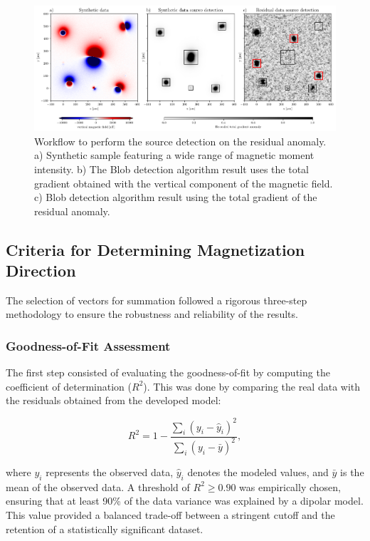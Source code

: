     \begin{figure}[tb!]
      \centering
      \includegraphics[width=1\linewidth]{paper/figures/re-detection-methodology.png}
      \caption{Workflow to perform the source detection on the residual anomaly. a) Synthetic sample featuring a wide range of magnetic moment intensity. b) The Blob detection algorithm result uses the total gradient obtained with the vertical component of the magnetic field. c) Blob detection algorithm result using the total gradient of the residual anomaly.}
      \label{method-redetection}
    \end{figure}


\subsection{Criteria for Determining Magnetization Direction}

The selection of vectors for summation followed a rigorous three-step methodology to ensure the robustness and reliability of the results.

\subsubsection{Goodness-of-Fit Assessment}

The first step consisted of evaluating the goodness-of-fit by computing the coefficient of determination ($R^2$). This was done by comparing the real data with the residuals obtained from the developed model:

\begin{equation}
    R^2 = 1 - \frac{\sum_{i} (y_i - \hat{y}_i)^2}{\sum_{i} (y_i - \bar{y})^2},
\end{equation}

where $y_i$ represents the observed data, $\hat{y}_i$ denotes the modeled values, and $\bar{y}$ is the mean of the observed data. A threshold of $R^2 \geq 0.90$ was empirically chosen, ensuring that at least 90\% of the data variance was explained by a dipolar model. This value provided a balanced trade-off between a stringent cutoff and the retention of a statistically significant dataset.

